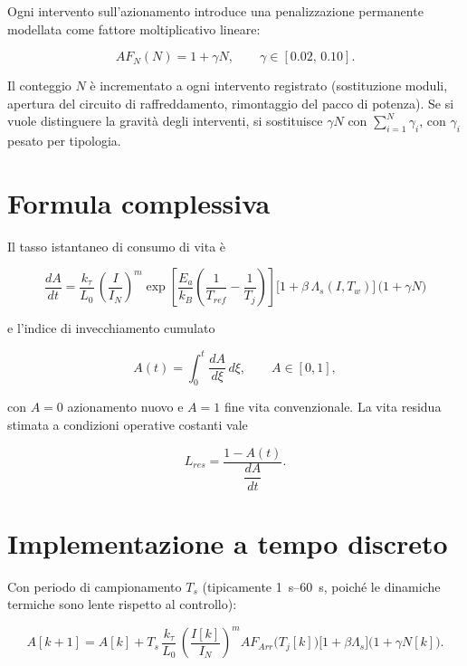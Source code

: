 \documentclass[11pt,a4paper]{article}
\begin{document}
Ogni intervento sull'azionamento introduce una penalizzazione permanente
modellata come fattore moltiplicativo lineare:

\begin{equation}
  AF_N(N) = 1 + \gamma N ,
  \qquad \gamma \in [0.02,\,0.10].
  \label{eq:interventi}
\end{equation}

Il conteggio $N$ è incrementato a ogni intervento registrato (sostituzione
moduli, apertura del circuito di raffreddamento, rimontaggio del pacco di
potenza). Se si vuole distinguere la gravità degli interventi, si sostituisce
$\gamma N$ con $\sum_{i=1}^{N}\gamma_i$, con $\gamma_i$ pesato per tipologia.

\section{Formula complessiva}

Il tasso istantaneo di consumo di vita è

\begin{equation}
  \boxed{\;
  \frac{dA}{dt} =
  \frac{k_\tau}{L_0}\,
  \left(\frac{I}{I_N}\right)^{m}
  \exp\!\left[\frac{E_a}{k_B}\!\left(\frac{1}{T_{ref}}-\frac{1}{T_j}\right)\right]
  \bigl[1+\beta\,\Lambda_s(I,T_w)\bigr]\,
  \bigl(1+\gamma N\bigr)\;}
  \label{eq:master}
\end{equation}

e l'indice di invecchiamento cumulato

\begin{equation}
  A(t) = \int_{0}^{t} \frac{dA}{d\xi}\,d\xi ,
  \qquad
  A \in [0,1],
\end{equation}

con $A = 0$ azionamento nuovo e $A = 1$ fine vita convenzionale. La vita residua
stimata a condizioni operative costanti vale

\begin{equation}
  L_{res} = \frac{1 - A(t)}{\dfrac{dA}{dt}} .
\end{equation}

\section{Implementazione a tempo discreto}

Con periodo di campionamento $T_s$ (tipicamente \SIrange{1}{60}{\second}, poiché
le dinamiche termiche sono lente rispetto al controllo):

\begin{equation}
  A[k+1] = A[k] + T_s\,
  \frac{k_\tau}{L_0}\,
  \left(\frac{I[k]}{I_N}\right)^{m} AF_{Arr}\bigl(T_j[k]\bigr)
  \bigl[1+\beta\Lambda_s\bigr]\bigl(1+\gamma N[k]\bigr).
\end{equation}
\end{document}
